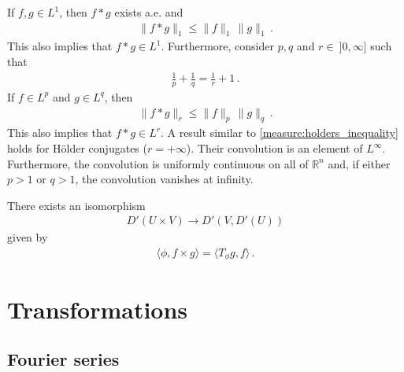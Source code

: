     \begin{property}
        If $f,g\in L^1$, then $f\ast g$ exists a.e. and
        \begin{gather}
            \|f\ast g\|_1\leq \|f\|_1\,\|g\|_1\,.
        \end{gather}
        This also implies that $f\ast g\in L^1$. Furthermore, consider $p,q$ and $r\in\ ]0,\infty]$ such that
        \begin{gather}
            \frac{1}{p}+\frac{1}{q} = \frac{1}{r}+1\,.
        \end{gather}
        If $f\in L^p$ and $g\in L^q$, then
        \begin{gather}
            \|f\ast g\|_r\leq\|f\|_p\,\|g\|_q\,.
        \end{gather}
        This also implies that $f\ast g\in L^r$. A result similar to \cref{measure:holders_inequality} holds for H\"older conjugates ($r=+\infty$). Their convolution is an element of $L^\infty$. Furthermore, the convolution is uniformly continuous on all of $\mathbb{R}^n$ and, if either $p>1$ or $q>1$, the convolution vanishes at infinity.
    \end{property}

    \begin{theorem}\label{distribution:kernel_theorem}
        There exists an isomorphism
        \begin{gather}
            D'(U\times V)\rightarrow D'(V,D'(U))
        \end{gather}
        given by
        \begin{gather}
            \langle\phi,f\times g\rangle = \langle T_\phi g,f \rangle\,.
        \end{gather}
    \end{theorem}


\section{Transformations}
\subsection{Fourier series}


